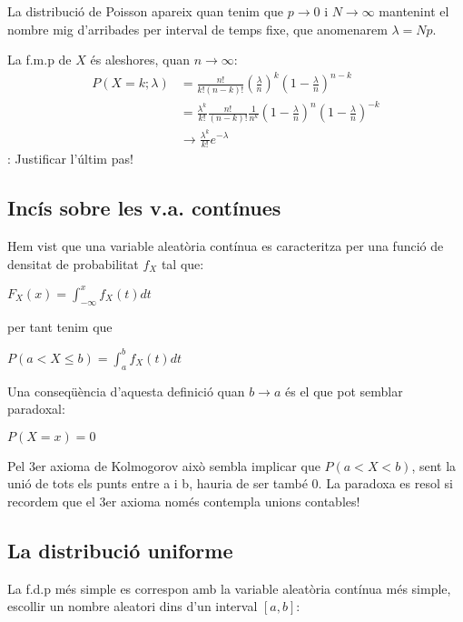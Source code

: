 \documentclass[letterpaper,10pt,english]{sphinxmanual}
\begin{document}
La distribució de Poisson apareix quan tenim que \(p \to 0\) i \(N \to \infty\)
mantenint el nombre mig d’arribades per interval de temps fixe, que anomenarem \(\lambda = Np\).

La f.m.p de  \(X\) és aleshores, quan \(n \to \infty\):
\begin{equation*}
\begin{split}P\left(X = k; \lambda \right) & =\frac{n!}{k!\left(n-k\right)!}\left(\frac{\lambda}{n}\right)^k\left(1-\frac{\lambda}{n}\right)^{n-k} \\
                     & =\frac{\lambda^k}{k!}\frac{n!}{\left(n-k\right)!}\frac{1}{n^k}\left(1 - \frac{\lambda}{n}\right)^n\left(1-\frac{\lambda}{n}\right)^{-k} \\
                     & \to \frac{\lambda^k}{k!}e^{-\lambda}\end{split}
\end{equation*}
: Justificar l’últim pas!


\subsection{Incís sobre les v.a. contínues}
\label{\detokenize{0_Intro/0_1_Repas_probabilitat:incis-sobre-les-v-a-continues}}
Hem vist que una variable aleatòria contínua es caracteritza per una funció
de densitat de probabilitat \(f_X\) tal que:

\(F_X\left(x\right) = \int_{-\infty}^x f_X\left(t\right)dt\)

per tant tenim que

\(P\left(a < X \leq b\right) = \int_{a}^b f_X\left(t\right)dt\)

Una conseqüència d’aquesta definició quan \(b \to a\) és el que pot semblar paradoxal:

\(P\left(X = x\right) = 0\)

Pel 3er axioma de Kolmogorov això sembla implicar que
\(P\left(a < X < b\right)\), sent la unió de tots els punts entre a i b, hauria
de ser també 0. La paradoxa es resol si recordem que el 3er axioma només contempla unions contables!


\subsection{La distribució uniforme}
\label{\detokenize{0_Intro/0_1_Repas_probabilitat:la-distribucio-uniforme}}
La f.d.p més simple es correspon amb la variable aleatòria contínua més simple, escollir
un nombre aleatori dins d’un interval \(\left[a, b\right]\):
\end{document}

